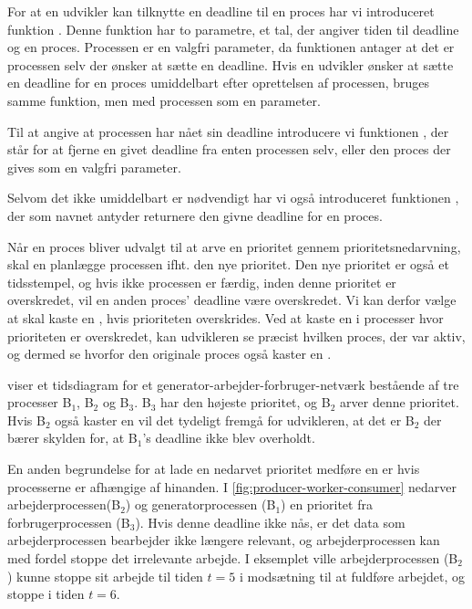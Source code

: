 For at en udvikler kan  tilknytte en deadline til en proces har vi introduceret funktion . Denne funktion har to parametre, et tal, der  angiver tiden  til deadline og en proces. Processen er en valgfri parameter, da funktionen antager at det er processen selv der ønsker at sætte en deadline. Hvis en udvikler ønsker at sætte en deadline for en proces umiddelbart efter oprettelsen af processen, bruges samme funktion, men med processen som en parameter.

Til at angive at processen har nået sin deadline introducere vi funktionen , der står for at fjerne en givet deadline fra enten processen selv, eller den proces der gives som en valgfri parameter.

Selvom det ikke umiddelbart er nødvendigt har vi også introduceret funktionen , der som navnet antyder returnere den givne deadline for en proces.

Når en proces bliver udvalgt til at arve en prioritet gennem prioritetsnedarvning, skal \sched en  planlægge processen ifht. den nye prioritet.
Den nye prioritet er også et tidsstempel, og hvis ikke processen er færdig, inden denne prioritet er overskredet, vil en anden proces' deadline være overskredet. 
Vi kan derfor vælge at  skal kaste en  ,  hvis  prioriteten overskrides. Ved at kaste en  i processer hvor prioriteten er overskredet, kan udvikleren se præcist hvilken proces, der var aktiv, og dermed se hvorfor den originale proces også kaster en . 

 viser et tidsdiagram for et generator-arbejder-forbruger-netværk bestående af tre processer B$_1$, B$_2$ og B$_3$. B$_3$ har den højeste prioritet, og B$_2$ arver denne prioritet. Hvis B$_2$ også kaster en  vil det tydeligt fremgå for udvikleren, at det er B$_2$ der bærer skylden for, at B$_1$'s deadline ikke blev overholdt.

En anden begrundelse for at lade en nedarvet prioritet medføre en  er hvis processerne er afhængige af hinanden. I \cref{fig:producer-worker-consumer}  nedarver  arbejderprocessen(B$_2$) og generatorprocessen (B$_1$) en  prioritet fra forbrugerprocessen (B$_3$). Hvis denne deadline ikke nås, er det data som arbejderprocessen bearbejder ikke længere relevant, og arbejderprocessen kan med fordel stoppe det irrelevante arbejde. I eksemplet ville arbejderprocessen (B$_2$) kunne stoppe sit arbejde til tiden $t = 5$ i modsætning til at fuldføre arbejdet, og stoppe i tiden $t = 6$.

